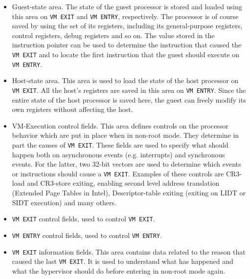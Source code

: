 \begin{itemize}
    \item Guest-state area. The state of the guest processor is stored and loaded using this area on \texttt{VM EXIT} and \texttt{VM ENTRY}, respectively. The processor is of course saved by using the set of its registers, including its general-purpose registers, control registers, debug registers and so on. The value stored in the instruction pointer can be used to determine the instruction that caused the \texttt{VM EXIT} and to locate the first instruction that the guest should execute on \texttt{VM ENTRY}.
    \item Host-state area. This area is used to load the state of the host processor on \texttt{VM EXIT}. All the host's registers are saved in this area on \texttt{VM ENTRY}. Since the entire state of the host processor is saved here, the guest can freely modify its own registers without affecting the host.
    \item VM-Execution control fields. This area defines controls on the processor behavior which are put in place when in non-root mode. They determine in part the causes of \texttt{VM EXIT}. These fields are used to specify what should happen both on asynchronous events (e.g. interrupts) and synchronous events. For the latter, two 32-bit vectors are used to determine which events or instructions should cause a \texttt{VM EXIT}. Examples of these controls are CR3-load and CR3-store exiting, enabling second level address translation (Extended Page Tables in Intel), Descriptor-table exiting (exiting on LIDT or SIDT execution) and many others.
    \item \texttt{VM EXIT} control fields, used to control \texttt{VM EXIT}.
    \item \texttt{VM ENTRY} control fields, used to control \texttt{VM ENTRY}.
    \item \texttt{VM EXIT} information fields. This area contains data related to the reason that caused the last \texttt{VM EXIT}. It is used to understand what has happened and what the hypervisor should do before entering in non-root mode again.
\end{itemize}
\par
